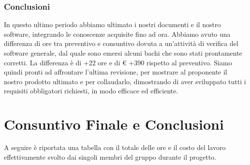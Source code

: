 \subsubsection{Conclusioni}
In questo ultimo periodo abbiamo ultimato i nostri documenti e il nostro software, integrando le conoscenze acquisite fino ad ora. Abbiamo avuto una differenza di ore tra preventivo e consuntivo dovuta a un'attività di verifica del software generale, dal quale sono emersi alcuni bachi che sono stati prontamente corretti. La differenza è di +22 ore e di € +390 rispetto al preventivo.
Siamo quindi pronti ad affrontare l'ultima revisione, per mostrare al proponente il nostro prodotto ultimato e per collaudarlo, dimostrando di aver sviluppato tutti i requisiti obbligatori richiesti, in modo efficace ed efficiente.

\section{Consuntivo Finale e Conclusioni}
A seguire è riportata una tabella con il totale delle ore e il costo del lavoro effettivamente svolto dai singoli membri del gruppo durante il progetto.
